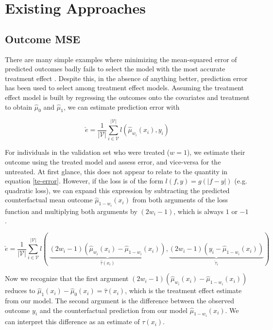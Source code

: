 \section{Existing Approaches}
\label{approaches}

\subsection{Outcome MSE}
\label{sec:pred-error}

There are many simple examples where minimizing the mean-squared error of predicted outcomes badly fails to select the model with the most accurate treatment effect \cite{Rolling:2013kz}. Despite this, in the absence of anything better, prediction error has been used to select among treatment effect models. Assuming the treatment effect model is built by regressing the outcomes onto the covariates and treatment to obtain $\hat\mu_0$ and $\hat\mu_1$, we can estimate prediction error with

\begin{equation}
	\check e = \frac{1}{|\mathcal{V}|} \sum_{i \in \mathcal{V}}^{|\mathcal{V}|}  
	l(\hat \mu_{w_i} (x_i), y_i) 
\label{pred-error}
\end{equation}
 
For individuals in the validation set who were treated ($w=1$), we estimate their outcome using the treated model and assess error, and vice-versa for the untreated. At first glance, this does not appear to relate to the quantity in equation \ref{te-error}. However, if the loss is of the form $l(f,y) = g(|f-y|)$ (e.g. quadratic loss), we can expand this expression by subtracting the predicted counterfactual mean outcome $\hat\mu_{1-w_i}(x_i)$ from both arguments of the loss function and multiplying both arguments by $(2w_i -1)$, which is always $1$ or $-1$.

\begin{equation}
	\check e = \frac{1}{|\mathcal{V}|} \sum_{i \in \mathcal{V}}^{|\mathcal{V}|}  
	l( \ 
	\underbrace{(2w_i -1) (\hat\mu_{w_i} (x_i) - \hat\mu_{1-w_i}(x_i))}_{\hat\tau(x_i)}, 
	\underbrace{(2w_i -1) (y_i - \hat\mu_{1-w_i}(x_i))}_{\check\tau_i}
	) 
\label{pred-error-expansion}
\end{equation}

Now we recognize that the first argument $(2w_i -1) (\hat\mu_{w_i} (x_i) - \hat\mu_{1-w_i}(x_i))$ reduces to $\hat\mu_1 (x_i) - \hat\mu_0(x_i) = \hat\tau(x_i)$, which is the treatment effect estimate from our model. The second argument is the difference between the observed outcome $y_i$ and the counterfactual prediction from our model $\hat\mu_{1-w_i}(x_i)$. We can interpret this difference as an estimate of $\tau(x_i)$. 

